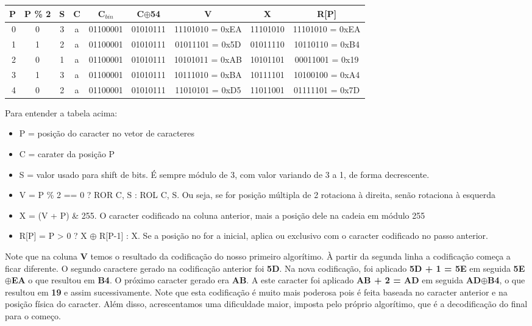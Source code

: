 \footnotesize
\noindent%
\begin{tabular}{@{}|r|c|c|c|c|c|c|c||c||}
\hline
P & P \% 2 & S & C & C$_{bin}$ & C$ \oplus $54 & V & X & R[P]\\
\hline
0 & 0 & 3 & a & 01100001 & 01010111 & 11101010 = 0xEA & 11101010 & 11101010 = 0xEA \\
1 & 1 & 2 & a & 01100001 & 01010111 & 01011101 = 0x5D & 01011110 & 10110110 = 0xB4 \\
2 & 0 & 1 & a & 01100001 & 01010111 & 10101011 = 0xAB & 10101101 & 00011001 = 0x19 \\
3 & 1 & 3 & a & 01100001 & 01010111 & 10111010 = 0xBA & 10111101 & 10100100 = 0xA4 \\
4 & 0 & 2 & a & 01100001 & 01010111 & 11010101 = 0xD5 & 11011001 & 01111101 = 0x7D \\
\hline
\end{tabular}
\normalsize


Para entender a tabela acima:
\begin{itemize}
\item P = posição do caracter no vetor de caracteres
\item C = carater da posição P
\item S = valor usado para shift de bits. É sempre módulo de 3, com valor variando de 3 a 1, de forma decrescente.
\item V = P \% 2 == 0 ? ROR C, S : ROL C, S. Ou seja, se for posição múltipla de 2 rotaciona à direita, senão rotaciona à esquerda
\item X = (V + P) \& 255. O caracter codificado na coluna anterior, mais a posição dele na cadeia em módulo 255
\item R[P] = P > 0 ? X $ \oplus $ R[P-1] : X. Se a posição no for a inicial, aplica ou exclusivo com o caracter codificado no passo anterior.
\end{itemize}
Note que na coluna \textbf{V} temos o resultado da codificação do nosso primeiro algorítimo. À partir da segunda linha a codificação começa a ficar diferente. O segundo caractere gerado na codificação anterior foi \textbf{5D}. Na nova codificação, foi aplicado \textbf{5D + 1 = 5E} em seguida \textbf{5E$ \oplus $EA} o que resultou em \textbf{B4}. O próximo caracter gerado era \textbf{AB}. A este caracter foi aplicado \textbf{AB + 2 = AD} em seguida \textbf{AD$ \oplus $B4}, o que resultou em \textbf{19} e assim sucessivamente. Note que esta codificação é muito mais poderosa pois é feita baseada no caracter anterior e na posição física do caracter. Além disso, acrescentamos uma dificuldade maior, imposta pelo próprio algorítimo, que é a decodificação do final para o começo.

